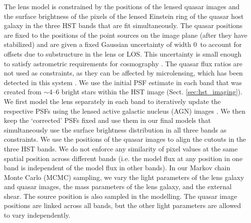 \documentclass[longauth]{aa}
\newcommand{\ajsiii}[1]{{{#1}}}
\begin{document}
The lens model is constrained by the positions of the lensed quasar images and the surface brightness of the pixels of the lensed Einstein ring of the quasar host galaxy in the three HST bands that are fit simultaneously. The quasar positions are fixed to the positions of the point sources on the image plane (after they have stabilized) and are given a fixed Gaussian uncertainty of width 0~to account for offsets due to substructure in the lens or LOS.  This uncertainty is small enough to satisfy astrometric requirements for cosmography \citep{Birrer19}. The quasar flux ratios are not used as constraints, as they can be affected by microlensing, which has been detected in this system \citep{Melo21}.  \ajsiii{We use} the initial PSF estimate in each band \ajsiii{that was} created from $\sim$4--6 bright stars within the HST image (Sect. \ref{sec:hst_imaging}).  We first model the lens separately in each band to iteratively update the respective PSFs using the lensed active galactic nucleus (AGN) images \citep{Chen16,Wong17,Rusu20}.  We then keep the `corrected' PSFs fixed and use them in our final models that simultaneously use the surface brightness distribution in all three bands as constraints.  We use the positions of the quasar images to align the cutouts in the three HST bands.  We do not enforce any similarity of pixel values at the same spatial position across different bands (i.e. the model flux at any position in one band is independent of the model flux in other bands).   In our Markov chain Monte Carlo (MCMC) sampling, we vary the light parameters of the lens galaxy and quasar images, the mass parameters of the lens galaxy, and the external shear.  The source position is also sampled in the modelling.  The quasar image positions are linked across all bands, but the other light parameters are allowed to vary independently.
\end{document}
